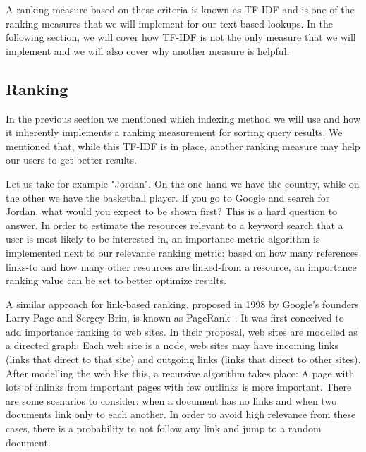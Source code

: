A ranking measure based on these criteria is known as TF-IDF and is one of the ranking measures that we will implement for our text-based lookups. In the following section, we will cover how TF-IDF is not the only measure that we will implement and we will also cover why another measure is helpful.


\subsection{Ranking}
\label{chap:pagerank}

In the previous section we mentioned which indexing method we will use and how it inherently implements a ranking measurement for sorting query results. We mentioned that, while this TF-IDF is in place, another ranking measure may help our users to get better results.

Let us take for example "Jordan". On the one hand we have the country, while on the other we have the basketball player. If you go to Google and search for Jordan, what would you expect to be shown first? This is a hard question to answer. In order to estimate the resources relevant to a keyword search that a user is most likely to be interested in, an importance metric algorithm is implemented next to our relevance ranking metric: based on how many references links-to and how many other resources are linked-from a resource, an importance ranking value can be set to better optimize results.

A similar approach for link-based ranking, proposed in 1998 by Google's founders Larry Page and Sergey Brin, is known as PageRank~\cite{Page1998}. It was first conceived to add importance ranking to web sites. In their proposal, web sites are modelled as a directed graph: Each web site is a node, web sites may have incoming links (links that direct to that site) and outgoing links (links that direct to other sites). After modelling the web like this, a recursive algorithm takes place: A page with lots of inlinks from important pages with few outlinks is more important. There are some scenarios to consider: when a document has no links and when two documents link only to each another. In order to avoid high relevance from these cases, there is a probability to not follow any link and jump to a random document.

